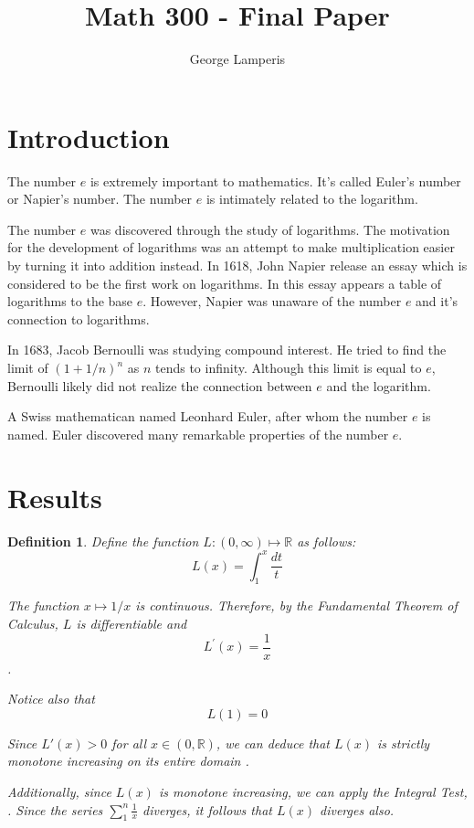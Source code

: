 \documentclass[12pt]{article}
\title{Math 300 - Final Paper}
\author{George Lamperis}
\date{}
\theoremstyle{mystyle}
\newtheorem{defn}[thm]{Definition}
\newcommand{\R}{\mathbb{R}}
\begin{document}
\maketitle

\section{Introduction}
The number $e$ is extremely important to mathematics. It's called Euler's number
or Napier's number. The number $e$ is intimately related to the logarithm.

The number $e$ was discovered through the study of logarithms. The motivation
for the development of logarithms was an attempt to make multiplication easier
by turning it into addition instead. In 1618, John Napier release an essay which
is considered to be the first work on logarithms. In this essay appears a table
of logarithms to the base $e$. However, Napier was unaware of the number $e$
and it's connection to logarithms.

In 1683, Jacob Bernoulli was studying compound interest. He tried to find the
limit of $(1 + 1/n)^n$ as $n$ tends to infinity. Although this limit is equal to
$e$, Bernoulli likely did not realize the connection between $e$ and the
logarithm.

A Swiss mathematican named Leonhard Euler, after whom the number $e$ is named.
Euler discovered many remarkable properties of the number $e$.



\section{Results}

\begin{defn}
  Define the function $L: (0, \infty) \mapsto \R$ as follows:
  $$ L(x) = \int_1^x \frac{dt}{t} $$
  
  The function $x \mapsto 1/x$ is continuous. Therefore, by the Fundamental
  Theorem of Calculus, $L$ is differentiable and
  $$ L^\prime(x) = \frac{1}{x} $$.
  
  Notice also that
  $$L(1) = 0$$
  
  Since $L'(x) > 0$ for all $x \in (0, \R)$,  we can deduce that $L(x)$ is
  strictly monotone increasing on its entire domain \cite[Theorem 4.13]{howie}.
  
  Additionally, since $L(x)$ is monotone increasing, we can apply the Integral
  Test, \cite[Theorem 5.37]{howie}. Since the series $\sum_1^n \frac{1}{x}$
  diverges, it follows that $L(x)$ diverges also.
\end{defn}
\end{document}
